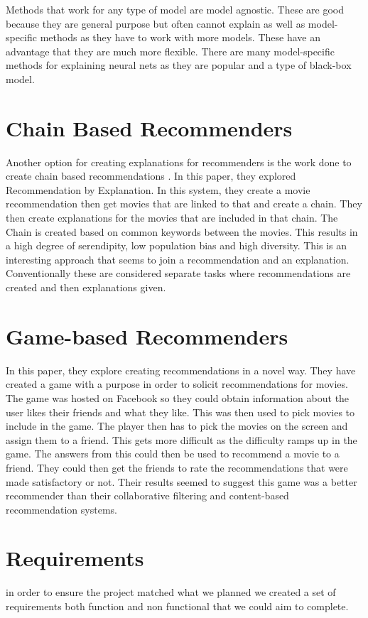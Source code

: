             Methods that work for any type of model are model agnostic. These are good because they are general purpose but often cannot  explain as well as model-specific methods as they have to work with more models.
            These have an advantage that they are much more flexible.
            There are many model-specific methods for explaining neural nets as they are popular and a type of black-box model.

        
    \section{Chain Based Recommenders}
        Another option for creating explanations for recommenders is the work done to create chain based recommendations \cite{Rana-Bridge-2017}. In this paper, they explored Recommendation by Explanation. In this system, they create a movie recommendation then get movies that are linked to that and create a chain. They then create explanations for the movies that are included in that chain. The Chain is created based on common keywords between the movies. This results in a high degree of serendipity, low population bias and high diversity. This is an interesting approach that seems to join a recommendation and an explanation. Conventionally these are considered separate tasks where recommendations are created and then explanations given.

    \section{Game-based Recommenders}
        \cite{10.1145/2792838.2799675}
        In this paper, they explore creating recommendations in a novel way. They have created a game with a purpose in order to solicit recommendations for movies.
        The game was hosted on Facebook so they could obtain information about the user likes their friends and what they like. This was then used to pick movies to include in the game. The player then has to pick the movies on the screen and assign them to a friend. This gets more difficult as the difficulty ramps up in the game. The answers from this could then be used to recommend a movie to a friend. They could then get the friends to rate the recommendations that were made satisfactory or not. Their results seemed to suggest this game was a better recommender than their collaborative filtering and content-based recommendation systems. 

    \section{Requirements}\label{sec:Requirements}
        in order to ensure the project matched what we planned we created a set of requirements both function and non functional that we could aim to complete.  
